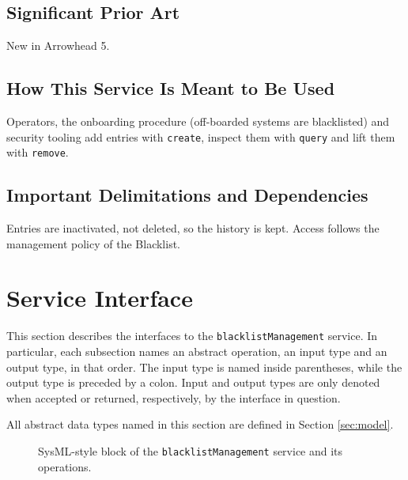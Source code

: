 \documentclass[a4paper]{arrowhead}
\begin{document}
\subsection{Significant Prior Art}

New in Arrowhead 5.

\subsection{How This Service Is Meant to Be Used}

Operators, the onboarding procedure (off-boarded systems are blacklisted) and security tooling add entries with \texttt{create}, inspect them with \texttt{query} and lift them with \texttt{remove}.

\subsection{Important Delimitations and Dependencies}
\label{sec:delimitations}

Entries are inactivated, not deleted, so the history is kept. Access follows the management policy of the Blacklist.

\newpage

\section{Service Interface}
\label{sec:operations}

This section describes the interfaces to the \texttt{blacklist\allowbreak{}Management} service.
In particular, each subsection names an abstract operation, an input type and an output type, in that order.
The input type is named inside parentheses, while the output type is preceded by a colon.
Input and output types are only denoted when accepted or returned, respectively, by the interface in question.

All abstract data types named in this section are defined in Section \ref{sec:model}.

\begin{figure}[ht!]
  \centering
  \caption{SysML-style block of the \texttt{blacklist\allowbreak{}Management} service and its operations.}
  \label{fig:SD}
\end{figure}
\end{document}
